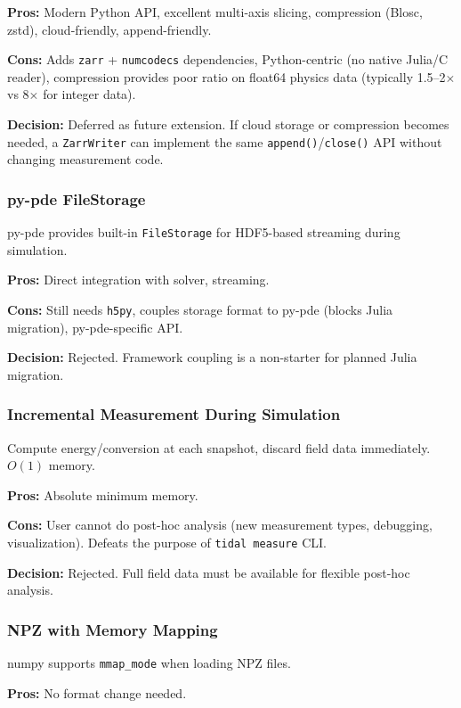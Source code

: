 \textbf{Pros:} Modern Python API, excellent multi-axis slicing, compression (Blosc, zstd), cloud-friendly, append-friendly.

\textbf{Cons:} Adds \texttt{zarr} + \texttt{numcodecs} dependencies, Python-centric (no native Julia/C reader), compression provides poor ratio on float64 physics data (typically 1.5--2$\times$ vs 8$\times$ for integer data).

\textbf{Decision:} Deferred as future extension. If cloud storage or compression becomes needed, a \texttt{ZarrWriter} can implement the same \texttt{append()}/\texttt{close()} API without changing measurement code.

\subsubsection{py-pde FileStorage}

py-pde provides built-in \texttt{FileStorage} for HDF5-based streaming during simulation.

\textbf{Pros:} Direct integration with solver, streaming.

\textbf{Cons:} Still needs \texttt{h5py}, couples storage format to py-pde (blocks Julia migration), py-pde-specific API.

\textbf{Decision:} Rejected. Framework coupling is a non-starter for planned Julia migration.

\subsubsection{Incremental Measurement During Simulation}

Compute energy/conversion at each snapshot, discard field data immediately. $O(1)$ memory.

\textbf{Pros:} Absolute minimum memory.

\textbf{Cons:} User cannot do post-hoc analysis (new measurement types, debugging, visualization). Defeats the purpose of \texttt{tidal measure} CLI.

\textbf{Decision:} Rejected. Full field data must be available for flexible post-hoc analysis.

\subsubsection{NPZ with Memory Mapping}

numpy supports \texttt{mmap\_mode} when loading NPZ files.

\textbf{Pros:} No format change needed.

